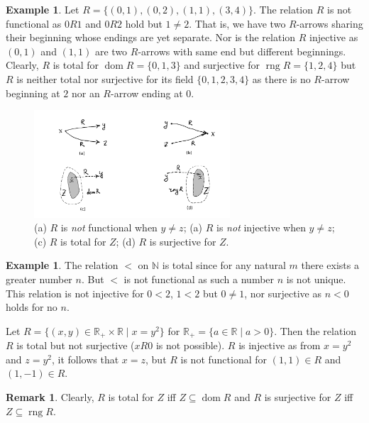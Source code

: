 \documentclass[12pt,notitlepage]{article}
\theoremstyle{plain}
\theoremstyle{definition}
\newtheorem{exm}[thm]{Example}
\newtheorem{rem}[thm]{Remark}
\theoremstyle{plain}
\newcommand{\N}{\mathbb{N}}
\newcommand{\R}{\mathbb{R}}
\newcommand{\sbs}{\subseteq}
\newcommand{\dom}{\mathop{\mathrm{dom}}}
\newcommand{\rng}{\mathop{\mathrm{rng}}}
\newcommand{\1}{\mathbf{1}}
\newcommand{\0}{\mathbf{0}}
\begin{document}
\begin{exm}
Let $R = \{(0,1), (0,2), (1,1), (3,4)\}$. The relation $R$ is not functional as $0 R 1$ and $0 R 2$ hold but $1 \neq 2$. That is, we have two $R$-arrows sharing their beginning whose endings are yet separate. Nor is the relation $R$ injective as $(0, 1)$ and $(1, 1)$ are two $R$-arrows with same end but different beginnings. Clearly, $R$ is total for $\dom R = \{0,1,3\}$ and surjective for $\rng R = \{1,2,4\}$ but $R$ is neither total nor surjective for its field $\{0,1,2,3,4\}$ as there is no $R$-arrow beginning at $2$ nor an $R$-arrow ending at $0$.
\end{exm}

\begin{figure}[h]
\centering
\includegraphics*[width=0.65\textwidth]{func_etc.pdf}
\caption{(a) $R$ is \emph{not} functional when $y \neq z$; (a) $R$ is \emph{not} injective when $y \neq z$; (c) $R$ is total for $Z$; (d) $R$ is surjective for $Z$.}
\end{figure}

 
\begin{exm}
The relation ${<}$ on $\N$ is total since for any natural $m$ there exists a greater number $n$. But ${<}$ is not functional as such a number $n$ is not unique. This relation is not injective for $0 < 2$, $1 < 2$ but $0 \neq 1$, nor surjective as $n < 0$ holds for no $n$. 

Let $R = \{(x,y) \in \R_{+} \times \R \mid x = y^2 \}$ for $\R_+ = \{a \in \R  \mid a > 0\}$. Then the relation $R$ is total but not surjective ($xR0$ is not possible). $R$ is injective as from $x = y^2$ and $z = y^2$, it follows that $x = z$, but $R$ is not functional for $(1, 1) \in R$ and $(1, -1) \in R$.
\end{exm}

\begin{rem}
Clearly, $R$ is total for $Z$ iff $Z \sbs \dom R$ and $R$ is surjective for $Z$ iff $Z \sbs \rng R$.
\end{rem}
\end{document}
